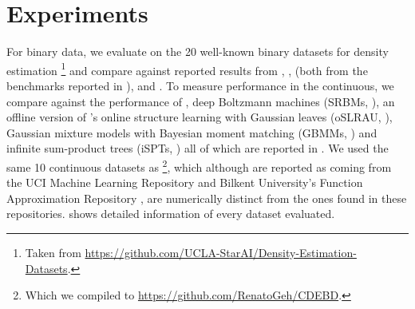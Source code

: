\section{Experiments}

For binary data, we evaluate  on the 20 well-known binary datasets for density
estimation \citep{lowd10,haaren12}\footnote{Taken from
\url{https://github.com/UCLA-StarAI/Density-Estimation-Datasets}.} and compare against reported
results from  \citep{gens13}, ,  (both
from the benchmarks reported in \cite{dang20}),  \citep{jaini18a} and
 \citep{dimauro21}. To measure performance in the continuous, we compare
 against the performance of , deep Boltzmann machines (SRBMs,
\cite{salakhutdinov09}), an offline version of \citeauthor{hsu17}'s online structure learning with
Gaussian leaves (oSLRAU, \cite{hsu17}), Gaussian mixture models with Bayesian moment matching
(GBMMs, \cite{jaini16}) and infinite sum-product trees (iSPTs, \cite{trapp16}) all of which are
reported in \citet{jaini18a}. We used the same 10 continuous datasets as
\citet{jaini18a}\footnote{Which we compiled to \url{https://github.com/RenatoGeh/CDEBD}.}, which
although are reported as coming from the UCI Machine Learning Repository \citep{dua17} and Bilkent
University's Function Approximation Repository \citep{guvenir00}, are numerically distinct from the
ones found in these repositories.  shows detailed information of every dataset
evaluated.

